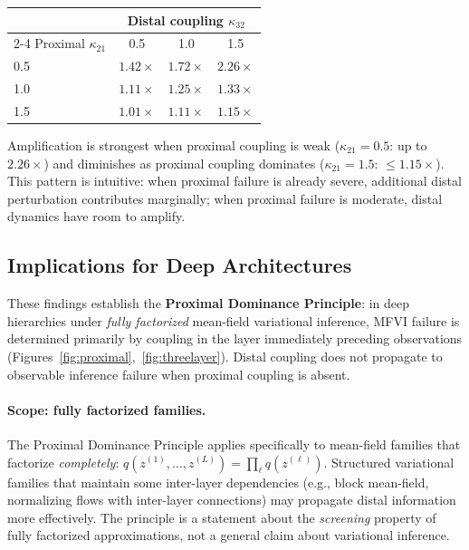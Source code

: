\documentclass[10pt]{article} %
\theoremstyle{plain}
\theoremstyle{definition}
\begin{document}
\begin{center}
\begin{tabular}{lccc}
\toprule
& \multicolumn{3}{c}{Distal coupling $\kappa_{32}$} \\
\cmidrule(lr){2-4}
Proximal $\kappa_{21}$ & 0.5 & 1.0 & 1.5 \\
\midrule
0.5 & $1.42\times$ & $1.72\times$ & $2.26\times$ \\
1.0 & $1.11\times$ & $1.25\times$ & $1.33\times$ \\
1.5 & $1.01\times$ & $1.11\times$ & $1.15\times$ \\
\bottomrule
\end{tabular}
\end{center}

\noindent Amplification is strongest when proximal coupling is weak ($\kappa_{21} = 0.5$: up to $2.26\times$) and diminishes as proximal coupling dominates ($\kappa_{21} = 1.5$: $\leq 1.15\times$). This pattern is intuitive: when proximal failure is already severe, additional distal perturbation contributes marginally; when proximal failure is moderate, distal dynamics have room to amplify.

\subsection{Implications for Deep Architectures}

These findings establish the \textbf{Proximal Dominance Principle}: in deep hierarchies under \emph{fully factorized} mean-field variational inference, MFVI failure is determined primarily by coupling in the layer immediately preceding observations (Figures~\ref{fig:proximal},~\ref{fig:threelayer}). Distal coupling does not propagate to observable inference failure when proximal coupling is absent.

\paragraph{Scope: fully factorized families.} The Proximal Dominance Principle applies specifically to mean-field families that factorize \emph{completely}: $q(z^{(1)}, \ldots, z^{(L)}) = \prod_{\ell} q(z^{(\ell)})$. Structured variational families that maintain some inter-layer dependencies (e.g., block mean-field, normalizing flows with inter-layer connections) may propagate distal information more effectively. The principle is a statement about the \emph{screening} property of fully factorized approximations, not a general claim about variational inference.
\end{document}
